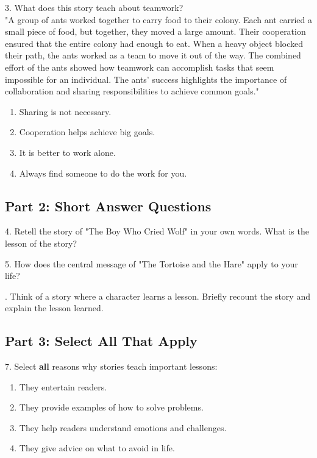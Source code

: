 \documentclass[12pt]{article}
\begin{document}
\vspace{1cm}

3. What does this story teach about teamwork?\\
"A group of ants worked together to carry food to their colony. Each ant carried a small piece of food, but together, they moved a large amount. Their cooperation ensured that the entire colony had enough to eat. When a heavy object blocked their path, the ants worked as a team to move it out of the way. The combined effort of the ants showed how teamwork can accomplish tasks that seem impossible for an individual. The ants’ success highlights the importance of collaboration and sharing responsibilities to achieve common goals."\\
\begin{enumerate}[label=\Alph*.]
    \item Sharing is not necessary.
    \item Cooperation helps achieve big goals.
    \item It is better to work alone.
    \item Always find someone to do the work for you.
\end{enumerate}

\vspace{1cm}


\subsection*{Part 2: Short Answer Questions}

4. Retell the story of "The Boy Who Cried Wolf" in your own words. What is the lesson of the story?\\
\vspace{4cm}

5. How does the central message of "The Tortoise and the Hare" apply to your life?\\
\vspace{4cm}

. Think of a story where a character learns a lesson. Briefly recount the story and explain the lesson learned.\\
\vspace{3cm}

\subsection*{Part 3: Select All That Apply}

7. Select \textbf{all} reasons why stories teach important lessons: \\
\begin{enumerate}[label=\Alph*.]
    \item They entertain readers.  
    \item They provide examples of how to solve problems.  
    \item They help readers understand emotions and challenges.  
    \item They give advice on what to avoid in life.  
\end{enumerate}
\end{document}
